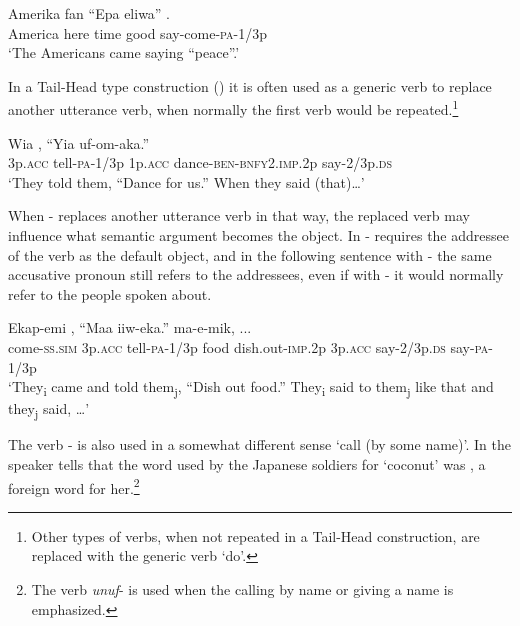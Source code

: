 \ea%
\label{ex:3:x942}
\gll Amerika fan ``Epa eliwa'' . \\
America here time good say-come-\textsc{pa}-1/3p\\
\glt`The Americans came saying ``peace''.'
\z

In a Tail-Head type construction () it is often used as a generic verb to replace another utterance verb, when normally the first verb would be repeated.\footnote{Other types of verbs, when not repeated in a Tail-Head construction, are replaced with the generic verb  `do'.} 

\ea%
\label{ex:3:x324}
\gll Wia , ``Yia uf-om-aka.'' \\
3p.\textsc{acc} tell-\textsc{pa}-1/3p 1p.\textsc{acc} dance-\textsc{ben}-\textsc{bnfy}2.\textsc{imp}.2p say-2/3p.\textsc{ds}\\
\glt`They told them, ``Dance for us.'' When they said (that){\dots}'
\z

When - replaces another utterance verb in that way, the replaced verb may influence what semantic argument becomes the object. In  - requires the addressee of the verb as the default object, and in the following sentence with - the same accusative pronoun \textit{ }still refers to the addressees, even if with - it would normally refer to the people spoken about.

\ea%
\label{ex:3:x325}
\gll Ekap-emi  , ``Maa iiw-eka.''   ma-e-mik, ...\\
come-\textsc{ss}.\textsc{sim} 3p.\textsc{acc} tell-\textsc{pa}-1/3p food dish.out-\textsc{imp}.2p 3p.\textsc{acc} say-2/3p.\textsc{ds} say-\textsc{pa}-1/3p\\
\glt`They\textsubscript{i} came and told them\textsubscript{j}, ``Dish out food.'' They\textsubscript{i} said to them\textsubscript{j} like that and they\textsubscript{j} said, {\dots}'
\z

The verb - is also used in a somewhat different sense `call (by some name)'. In  the speaker tells that the word used by the Japanese soldiers for `coconut' was , a foreign word for her.\footnote{The verb \textit{unuf}- is used when the calling by name or giving a name is emphasized.}

